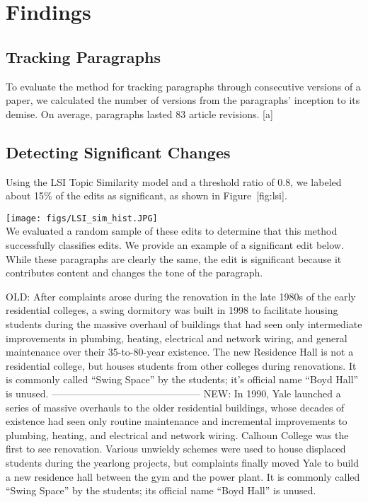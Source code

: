 \section{Findings}\label{findings}

\subsection{Tracking Paragraphs}\label{tracking-paragraphs-1}

To evaluate the method for tracking paragraphs through consecutive
versions of a paper, we calculated the number of versions from the
paragraphs' inception to its demise. On average, paragraphs lasted 83
article revisions. {[}a{]}

\subsection{Detecting Significant
Changes}\label{detecting-significant-changes}

Using the LSI Topic Similarity model and a threshold ratio of 0.8, we
labeled about 15\% of the edits as significant, as shown in
Figure~{[}fig:lsi{]}.

\texttt{[image: figs/LSI\_sim\_hist.JPG]}\\

We evaluated a random sample of these edits to determine that this
method successfully classifies edits. We provide an example of a
significant edit below. While these paragraphs are clearly the same, the
edit is significant because it contributes content and changes the tone
of the paragraph.

OLD: After complaints arose during the renovation in the late 1980s of
the early residential colleges, a swing dormitory was built in 1998 to
facilitate housing students during the massive overhaul of buildings
that had seen only intermediate improvements in plumbing, heating,
electrical and network wiring, and general maintenance over their
35-to-80-year existence. The new Residence Hall is not a residential
college, but houses students from other colleges during renovations. It
is commonly called ``Swing Space'' by the students; it's official name
``Boyd Hall'' is unused. ---------------------------------------------
NEW: In 1990, Yale launched a series of massive overhauls to the older
residential buildings, whose decades of existence had seen only routine
maintenance and incremental improvements to plumbing, heating, and
electrical and network wiring. Calhoun College was the first to see
renovation. Various unwieldy schemes were used to house displaced
students during the yearlong projects, but complaints finally moved Yale
to build a new residence hall between the gym and the power plant. It is
commonly called ``Swing Space'' by the students; its official name
``Boyd Hall'' is unused.

